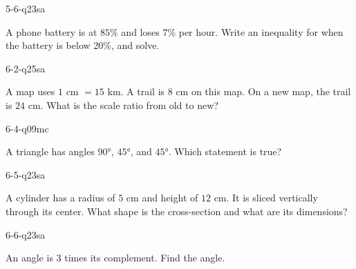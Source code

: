 \begin{practiceQuestion}{5-6-q23}{sa}
\begin{questionText}
A phone battery is at $85\%$ and loses $7\%$ per hour. Write an inequality for when the battery is below $20\%$, and solve.
\end{questionText}
\end{practiceQuestion}

\begin{practiceQuestion}{6-2-q25}{sa}
\begin{questionText}
A map uses $1$ cm $= 15$ km. A trail is $8$ cm on this map. On a new map, the trail is $24$ cm. What is the scale ratio from old to new?
\end{questionText}
\end{practiceQuestion}

\begin{practiceQuestion}{6-4-q09}{mc}
\begin{questionText}
A triangle has angles $90°$, $45°$, and $45°$. Which statement is true?
\end{questionText}
\end{practiceQuestion}

\begin{practiceQuestion}{6-5-q23}{sa}
\begin{questionText}
A cylinder has a radius of $5$ cm and height of $12$ cm. It is sliced vertically through its center. What shape is the cross-section and what are its dimensions?
\end{questionText}
\end{practiceQuestion}

\begin{practiceQuestion}{6-6-q23}{sa}
\begin{questionText}
An angle is $3$ times its complement. Find the angle.
\end{questionText}
\end{practiceQuestion}

